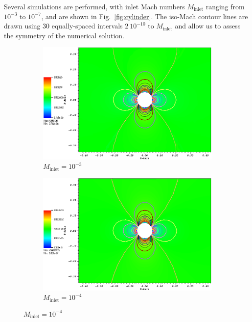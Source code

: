 \documentclass[preprint,10pt]{elsarticle}
\newcommand{\fig}[1]{Fig.~\ref{#1}}                      %
\begin{document}
Several simulations are performed, with inlet Mach numbers $M_{\text{inlet}}$ ranging from $10^{-3}$ to $10^{-7}$, and are shown in \fig{fig:cylinder}. The iso-Mach contour lines are drawn using $30$ equally-spaced intervals $2 \ 10^{-10}$ to $M_{\text{inlet}}$ and allow us to assess the symmetry of the numerical solution.
%
\begin{figure}[H]
        \centering
        \begin{subfigure}[b]{0.495\textwidth}
                \centering
                \includegraphics[width=\textwidth]{CylinderMach1em3ZoomIn.png}
                \caption{$M_{\text{inlet}}=10^{-3}$}
                \label{fig:cyl_1em3}
        \end{subfigure}%

        \begin{subfigure}[b]{0.495\textwidth}
                \centering
                \includegraphics[width=\textwidth]{CylinderMach1em4ZoomIn.png}
                \caption{$M_{\text{inlet}}=10^{-4}$}
                \label{fig:cyl_1em4}
        \end{subfigure}    


\end{figure}
\end{document}
